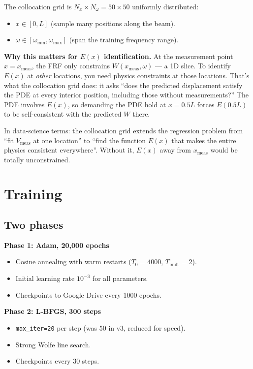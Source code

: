 \documentclass[11pt,a4paper]{article}
\begin{document}
The collocation grid is $N_x \times N_\omega = 50 \times 50$ uniformly distributed:
\begin{itemize}[leftmargin=*, itemsep=2pt]
\item $x \in [0, L]$ (sample many positions along the beam).
\item $\omega \in [\omega_\text{min}, \omega_\text{max}]$ (span the training frequency range).
\end{itemize}

\textbf{Why this matters for $E(x)$ identification.} At the measurement point $x = x_\text{meas}$, the FRF only constrains $W(x_\text{meas}, \omega)$ --- a 1D slice. To identify $E(x)$ at \emph{other} locations, you need physics constraints at those locations. That's what the collocation grid does: it asks ``does the predicted displacement satisfy the PDE at every interior position, including those without measurements?'' The PDE involves $E(x)$, so demanding the PDE hold at $x = 0.5L$ forces $E(0.5L)$ to be self-consistent with the predicted $W$ there.

In data-science terms: the collocation grid extends the regression problem from ``fit $V_\text{meas}$ at one location'' to ``find the function $E(x)$ that makes the entire physics consistent everywhere''. Without it, $E(x)$ away from $x_\text{meas}$ would be totally unconstrained.

\section{Training}
\label{sec:training}

\subsection{Two phases}

\textbf{Phase 1: Adam, 20{,}000 epochs}
\begin{itemize}[leftmargin=*, itemsep=2pt]
\item Cosine annealing with warm restarts ($T_0 = 4000$, $T_\text{mult} = 2$).
\item Initial learning rate $10^{-3}$ for all parameters.
\item Checkpoints to Google Drive every 1000 epochs.
\end{itemize}

\textbf{Phase 2: L-BFGS, 300 steps}
\begin{itemize}[leftmargin=*, itemsep=2pt]
\item \texttt{max\_iter=20} per step (was 50 in v3, reduced for speed).
\item Strong Wolfe line search.
\item Checkpoints every 30 steps.
\end{itemize}
\end{document}
